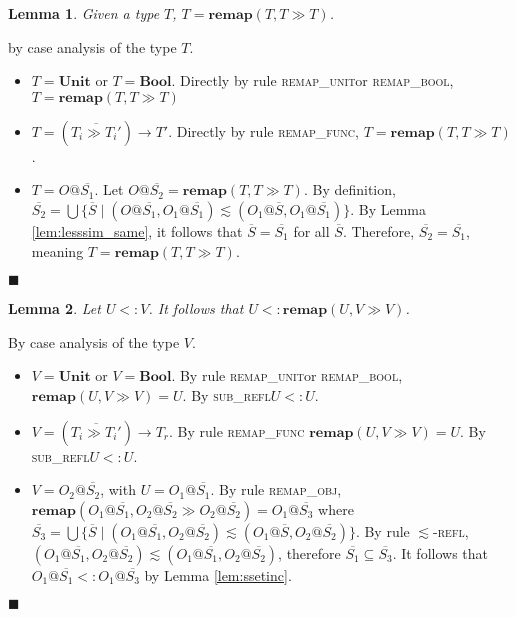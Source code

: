 \documentclass[preprint]{sigplanconf}
\makeatletter
\newtheorem{lem}{Lemma}
\newcommand{\lemref}[1]{Lemma \ref{#1}}
\newcommand{\subrefl}{\textsc{sub\_refl}}
\newcommand{\remapunit}{\textsc{remap\_unit}}
\newcommand{\remapbool}{\textsc{remap\_bool}}
\newcommand{\remapfunc}{\textsc{remap\_func}}
\newcommand{\remapobj}{\textsc{remap\_obj}}
\newcommand{\remapapp}[3]{\ensuremath{\mathbf{remap}(#1, #2 \gg #3)}}
\newcommand{\unitt}{\mathbf{Unit}}
\newcommand{\boolt}{\mathbf{Bool}}
\newcommand{\ot}[2]{#1@\overline{#2}}
\newcommand{\funt}[3]{(\overline{#1 \gg #2}) \rightarrow #3}
\newcommand{\qed}{$\blacksquare$}
\newenvironment{proof}{\vspace{1ex}\noindent{\bf Proof}\hspace{0.5em}}
  {\hfill\qed\vspace{1ex}}
\makeatother
\begin{document}
\begin{lem}
\label{lem:remapsame}
Given a type $T$, $T = \remapapp{T}{T}{T}$.
\end{lem}

\begin{proof}
by case analysis of the type $T$.

\begin{itemize}
\item $T = \unitt$ or $T = \boolt$. 
Directly by rule \remapunit or \remapbool, $T = \remapapp{T}{T}{T}$

\item $T = \funt{T_i}{T_i'}{T'}$. Directly by rule
\remapfunc, $T = \remapapp{T}{T}{T}$.

\item $T = \ot{O}{S_1}$. Let $\ot{O}{S_2} = \remapapp{T}{T}{T}$. By definition,
$\overline{S_2} = \bigcup \{ \overline{S} \mid (\ot{O}{S_1}, \ot{O_1}{S_1}) \lesssim (\ot{O_1}{S}, \ot{O_1}{S_1}) \}$. By \lemref{lem:lesssim_same}, it follows that
$\overline{S} = \overline{S_1}$ for all $\overline{S}$. Therefore,
$\overline{S_2} = \overline{S_1}$, meaning
$T = \remapapp{T}{T}{T}$.
\end{itemize}
\end{proof}


\begin{lem}
\label{lem:remapeff}
Let $U <: V$. It follows that $U <: \remapapp{U}{V}{V}$.
\end{lem}
\begin{proof}
By case analysis of the type $V$.

\begin{itemize}
\item $V = \unitt$ or $V = \boolt$. By rule \remapunit or \remapbool,
$\remapapp{U}{V}{V} = U$. By \subrefl $U <: U$.

\item $V = \funt{T_i}{T_i'}{T_r}$. By rule \remapfunc
$\remapapp{U}{V}{V} = U$. By \subrefl $U <: U$.

\item $V = \ot{O_2}{S_2}$, with $U = \ot{O_1}{S_1}$.
By rule \remapobj, $\remapapp{\ot{O_1}{S_1}}{\ot{O_2}{S_2}}{\ot{O_2}{S_2}} = \ot{O_1}{S_3}$ where
$\overline{S_3} = \bigcup \{ \overline{S} \mid (\ot{O_1}{S_1}, \ot{O_2}{S_2}) \lesssim (\ot{O_1}{S}, \ot{O_2}{S_2}) \}$.
By rule $\lesssim$\textsc{-refl},
$(\ot{O_1}{S_1}, \ot{O_2}{S_2}) \lesssim (\ot{O_1}{S_1}, \ot{O_2}{S_2})$,
therefore $\overline{S_1} \subseteq \overline{S_3}$. It follows that
$\ot{O_1}{S_1} <: \ot{O_1}{S_3}$ by \lemref{lem:ssetinc}.

\end{itemize}
\end{proof}
\end{document}
